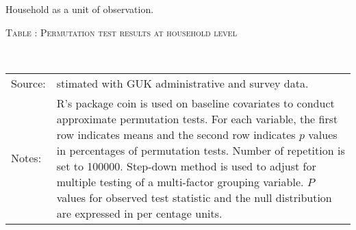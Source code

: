 Household as a unit of observation. 


\hspace{-1.0cm}\begin{minipage}[t]{14cm}
\hfil\textsc{\normalsize Table \thetable: Permutation test results at household level\label{tab permHH}}\\
\setlength{\tabcolsep}{.5pt}
\setlength{\baselineskip}{8pt}
\renewcommand{\arraystretch}{.50}
\hfil{}\\
\renewcommand{\arraystretch}{.8}
\setlength{\tabcolsep}{1pt}
\begin{tabular}{>{\hfill\scriptsize}p{1cm}<{}>{\scriptsize}p{13cm}<{\hfill}}
Source:& stimated with GUK administrative and survey data.\\
Notes: & \textsf{R}'s package \textsf{coin} is used on baseline covariates to conduct approximate permutation tests. For each variable, the first row indicates means and the second row indicates $p$ values in percentages of permutation tests. Number of repetition is set to 100000. Step-down method is used to adjust for multiple testing of a multi-factor grouping variable. $P$ values for observed test statistic and the null distribution are expressed in per centage units.
\end{tabular}
\end{minipage}







